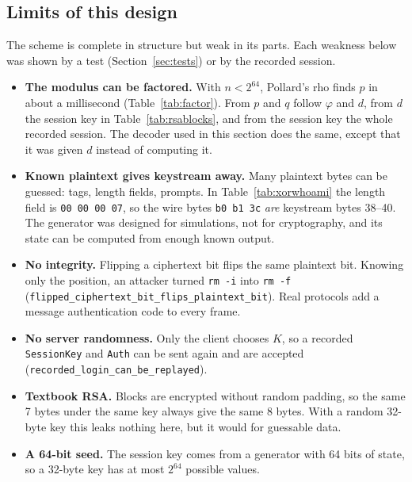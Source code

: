 \subsection{Limits of this design}
\label{sec:cryptolimits}

The scheme is complete in structure but weak in its parts. Each weakness below
was shown by a test (Section~\ref{sec:tests}) or by the recorded session.

\begin{itemize}
\item \textbf{The modulus can be factored.} With $n < 2^{64}$, Pollard's rho
  finds $p$ in about a millisecond (Table~\ref{tab:factor}). From $p$ and $q$
  follow $\varphi$ and $d$, from $d$ the session key in
  Table~\ref{tab:rsablocks}, and from the session key the whole recorded
  session. The decoder used in this section does the same, except that it was
  given $d$ instead of computing it.
\item \textbf{Known plaintext gives keystream away.} Many plaintext bytes can be
  guessed: tags, length fields, prompts. In Table~\ref{tab:xorwhoami} the
  length field is \texttt{00 00 00 07}, so the wire bytes \texttt{b0 b1 3c}
  \emph{are} keystream bytes 38--40. The generator was designed for simulations,
  not for cryptography, and its state can be computed from enough known
  output.
\item \textbf{No integrity.} Flipping a ciphertext bit flips the same plaintext
  bit. Knowing only the position, an attacker turned \texttt{rm -i} into
  \texttt{rm -f} (\texttt{flipped\_ciphertext\_bit\_\allowbreak flips\_plaintext\_bit}).
  Real protocols add a message authentication code to every frame.
\item \textbf{No server randomness.} Only the client chooses $K$, so a recorded
  \texttt{SessionKey} and \texttt{Auth} can be sent again and are accepted
  (\texttt{recorded\_login\_can\_be\_replayed}).
\item \textbf{Textbook RSA.} Blocks are encrypted without random padding, so
  the same 7 bytes under the same key always give the same 8 bytes. With a
  random 32-byte key this leaks nothing here, but it would for guessable data.
\item \textbf{A 64-bit seed.} The session key comes from a generator with 64
  bits of state, so a 32-byte key has at most $2^{64}$ possible values.
\end{itemize}
